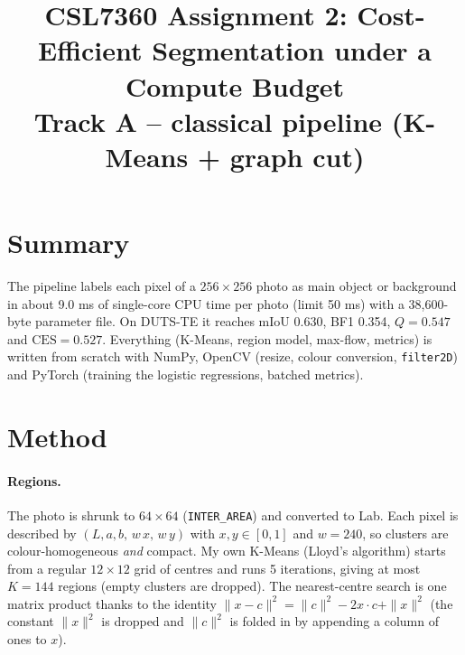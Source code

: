 \documentclass[11pt,a4paper]{article}
\title{CSL7360 Assignment 2: Cost-Efficient Segmentation under a Compute Budget\\\large Track A -- classical pipeline (K-Means + graph cut)}
\author{}
\date{}
\begin{document}
\maketitle

\section{Summary}
The pipeline labels each pixel of a $256{\times}256$ photo as main object or background in about 9.0 ms of single-core CPU time per photo
(limit 50 ms) with a 38,600-byte parameter file. On DUTS-TE it reaches mIoU 0.630, BF1 0.354, $Q=0.547$ and
$\mathrm{CES}=0.527$. Everything (K-Means, region model, max-flow, metrics) is written from scratch with NumPy, OpenCV
(resize, colour conversion, \texttt{filter2D}) and PyTorch (training the logistic regressions, batched metrics).

\section{Method}
\paragraph{Regions.} The photo is shrunk to $64{\times}64$ (\texttt{INTER\_AREA}) and converted to Lab. Each pixel is described by
$(L,a,b,\,w\,x,\,w\,y)$ with $x,y\in[0,1]$ and $w=240$, so clusters are colour-homogeneous \emph{and} compact.
My own K-Means (Lloyd's algorithm) starts from a regular $12{\times}12$ grid of centres and runs 5 iterations, giving at most
$K=144$ regions (empty clusters are dropped). The nearest-centre search is one matrix product thanks to the identity
$\|x-c\|^2=\|c\|^2-2x\!\cdot\!c+\|x\|^2$ (the constant $\|x\|^2$ is dropped and $\|c\|^2$ is folded in by appending a column of ones to $x$).
\end{document}
